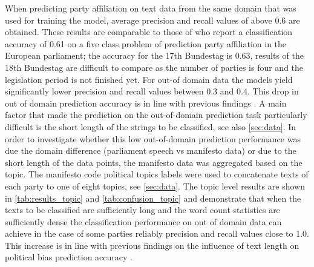 \documentclass{article}
\begin{document}
When predicting party affiliation on text data from the same domain that was used for training the model, average precision and recall values of above 0.6 are obtained. These results are comparable to those of \cite{Hirst2014} who report a classification accuracy of 0.61 on a five class problem of prediction party affiliation in the European parliament; the accuracy for the 17th Bundestag is 0.63, results of the 18th Bundestag are difficult to compare as the number of parties is four and the legislation period is not finished yet.
For out-of domain data the models yield significantly lower precision and recall values between 0.3 and 0.4.  This drop in out of domain prediction accuracy is in line with previous findings \cite{Yu2008}.
A main factor that made the prediction on the out-of-domain prediction task particularly difficult is the short length of the strings to be classified, see also \autoref{sec:data}. In order to investigate whether this low out-of-domain prediction performance was due the domain difference (parliament speech vs manifesto data) or due to the short length of the data points, the manifesto data was aggregated based on the topic. The manifesto code political topics labels were used to concatenate texts of each party to one of eight topics, see \autoref{sec:data}. The topic level results are shown in \autoref{tab:results_topic} and \autoref{tab:confusion_topic} and demonstrate that when the texts to be classified are sufficiently long and the word count statistics are sufficiently dense the classification performance on out of domain data can achieve in the case of some parties reliably precision and recall values close to 1.0. This increase is in line with previous findings on the influence of text length on political bias prediction accuracy \cite{Hirst2014}.
\end{document}
